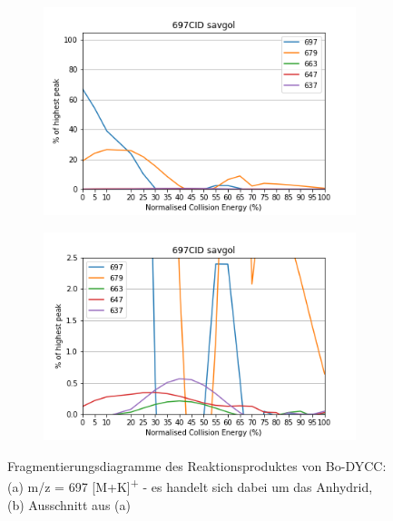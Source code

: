 \begin{figure}[!htbp]
  \begin{subfigure}[b]{0.5\textwidth}
    \includegraphics[width=\textwidth]{content/Anhang/MSLeafspray/RP_Bo-DYCC/697CID-697savgol.png}
    \caption{}
  \end{subfigure}
  \hfill
  \begin{subfigure}[b]{0.5\textwidth}
    \includegraphics[width=\textwidth]{content/Anhang/MSLeafspray/RP_Bo-DYCC/697CID-697savgolv25.png}
    \caption{}
  \end{subfigure}
  
  \caption[Fragmentierungsdiagramme des Reaktionsproduktes von Bo-DYCC, Quelle: Autor]{Fragmentierungsdiagramme des Reaktionsproduktes von Bo-DYCC: (a) m/z = 697 [M+K]\textsuperscript{+} - es handelt sich dabei um das Anhydrid, (b) Ausschnitt aus (a)}
\end{figure}

